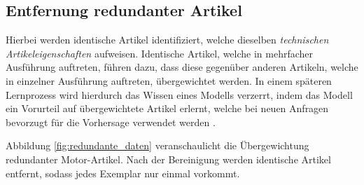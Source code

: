 \subsection{Entfernung redundanter Artikel}
\label{sec:entfernung_redundanter_artikel}

Hierbei werden identische Artikel identifiziert, welche dieselben \textit{technischen Artikeleigenschaften} aufweisen. 
Identische Artikel, welche in mehrfacher Ausführung auftreten, führen dazu, dass diese gegenüber anderen Artikeln, welche in einzelner Ausführung auftreten, 
übergewichtet werden. In einem späteren Lernprozess wird hierdurch das Wissen eines Modells verzerrt, indem 
das Modell ein Vorurteil auf übergewichtete Artikel erlernt, welche bei neuen Anfragen bevorzugt für die Vorhersage verwendet werden \cite{hastie2009elements,sabzekar2021noiseaware}.

Abbildung \ref{fig:redundante_daten} veranschaulicht die Übergewichtung redundanter Motor-Artikel. Nach der Bereinigung werden identische Artikel entfernt, sodass jedes Exemplar nur einmal vorkommt.

